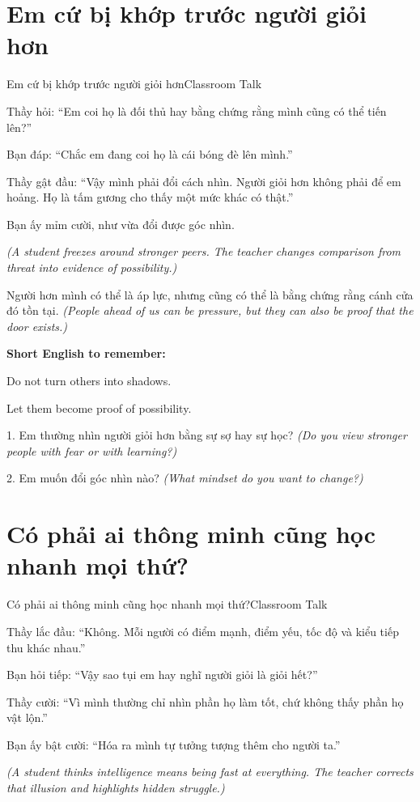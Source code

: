 \section{Em cứ bị khớp trước người giỏi hơn}
\begin{truyen}{Em cứ bị khớp trước người giỏi hơn}{Classroom Talk}

Thầy hỏi: ``Em coi họ là đối thủ hay bằng chứng rằng mình cũng có thể tiến lên?''

Bạn đáp: ``Chắc em đang coi họ là cái bóng đè lên mình.''

Thầy gật đầu: ``Vậy mình phải đổi cách nhìn. Người giỏi hơn không phải để em hoảng. Họ là tấm gương cho thấy một mức khác có thật.''

Bạn ấy mỉm cười, như vừa đổi được góc nhìn.

\textit{(A student freezes around stronger peers. The teacher changes comparison from threat into evidence of possibility.)}
\end{truyen}

\begin{baihoc}
Người hơn mình có thể là áp lực, nhưng cũng có thể là bằng chứng rằng cánh cửa đó tồn tại.
\textit{(People ahead of us can be pressure, but they can also be proof that the door exists.)}
\end{baihoc}

\begin{ghinhoanh}
\textbf{Short English to remember:}

Do not turn others into shadows.

Let them become proof of possibility.
\end{ghinhoanh}

\begin{tuhocnhanh}
1. Em thường nhìn người giỏi hơn bằng sự sợ hay sự học? \textit{(Do you view stronger people with fear or with learning?)}

2. Em muốn đổi góc nhìn nào? \textit{(What mindset do you want to change?)}
\end{tuhocnhanh}
\ngancach

\section{Có phải ai thông minh cũng học nhanh mọi thứ?}
\begin{truyen}{Có phải ai thông minh cũng học nhanh mọi thứ?}{Classroom Talk}

Thầy lắc đầu: ``Không. Mỗi người có điểm mạnh, điểm yếu, tốc độ và kiểu tiếp thu khác nhau.''

Bạn hỏi tiếp: ``Vậy sao tụi em hay nghĩ người giỏi là giỏi hết?''

Thầy cười: ``Vì mình thường chỉ nhìn phần họ làm tốt, chứ không thấy phần họ vật lộn.''

Bạn ấy bật cười: ``Hóa ra mình tự tưởng tượng thêm cho người ta.''

\textit{(A student thinks intelligence means being fast at everything. The teacher corrects that illusion and highlights hidden struggle.)}
\end{truyen}

